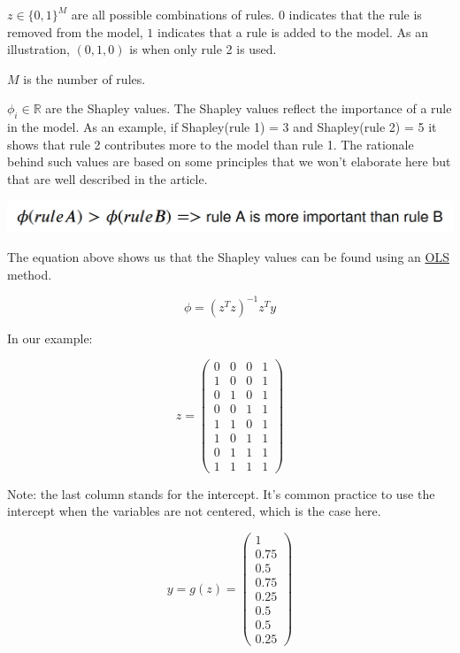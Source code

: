 $z \in \{0,1\}^M$ are all possible combinations of rules. $0$ indicates that the rule is removed from the model, $1$ indicates that a rule is added to the model. As an illustration, $(0,1,0)$ is when only rule 2 is used.

$M$ is the number of rules. 

$\phi_i \in \mathbb{R}$ are the Shapley values. The Shapley values reflect the importance of a rule in the model. As an example, if Shapley(rule 1) = 3 and Shapley(rule 2) = 5 it shows that rule 2 contributes more to the model than rule 1. The rationale behind such values are based on some principles that we won't elaborate here but that are well described in the article. \\

\begin{center}
\includegraphics[scale=0.2]{./../img/rule-shapley.png}
\end{center}

The equation above shows us that the Shapley values can be found using an \href{https://en.wikipedia.org/wiki/Ordinary_least_squares}{OLS} method.

$$\phi = (z^Tz)^{-1}z^Ty$$

In our example:

$$z = \begin{pmatrix}
0 & 0 & 0 & 1\\
1 & 0 & 0 & 1\\
0 & 1 & 0 & 1\\
0 & 0 & 1 & 1\\
1 & 1 & 0 & 1\\
1 & 0 & 1 & 1\\
0 & 1 & 1 & 1\\
1 & 1 & 1 & 1
\end{pmatrix}$$

Note: the last column stands for the intercept. It's common practice to use the intercept when the variables are not centered, which is the case here.

$$y = g(z) = \begin{pmatrix}
1 \\
0.75 \\
0.5 \\
0.75 \\
0.25 \\
0.5 \\
0.5 \\
0.25
\end{pmatrix}$$

